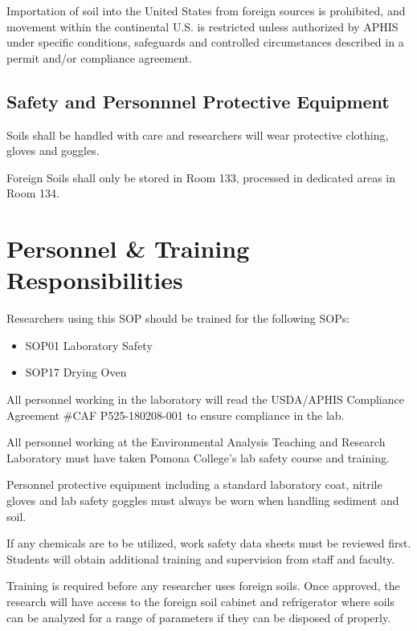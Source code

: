 \documentclass[12pt]{../SOP3}\usepackage[]{graphicx}\usepackage[]{color}
\begin{document}
\NP Importation of soil into the United States from foreign sources is prohibited, and movement within the continental U.S. is restricted unless authorized by APHIS under specific conditions, safeguards and controlled circumstances described in a permit and/or compliance agreement.


\subsection{Safety and Personnnel Protective Equipment}

\NP Soils shall be handled with care and researchers will wear protective clothing, gloves and goggles. 

\NP Foreign Soils shall only be stored in Room 133, processed in dedicated areas in Room 134.


\section{Personnel \& Training Responsibilities}

\NP Researchers using this SOP should be trained for the following SOPs:

\begin{itemize}
  \item SOP01 Laboratory Safety
  \item SOP17 Drying Oven
\end{itemize}

\NP All personnel working in the laboratory will read the USDA/APHIS Compliance Agreement \#CAF P525-180208-001 to ensure compliance in the lab.

\NP All personnel working at the Environmental Analysis Teaching and Research Laboratory must have taken Pomona College's lab safety course and training.

\NP Personnel protective equipment including a standard laboratory coat, nitrile gloves and lab safety goggles must always be worn when handling sediment and soil. 

\NP If any chemicals are to be utilized, work safety data sheets must be reviewed first. Students will obtain additional training and supervision from staff and faculty. 

\NP Training is required before any researcher uses foreign soils. Once approved, the research will have access to the foreign soil cabinet and refrigerator where soils can be analyzed for a range of parameters if they can be disposed of properly.  
\end{document}
